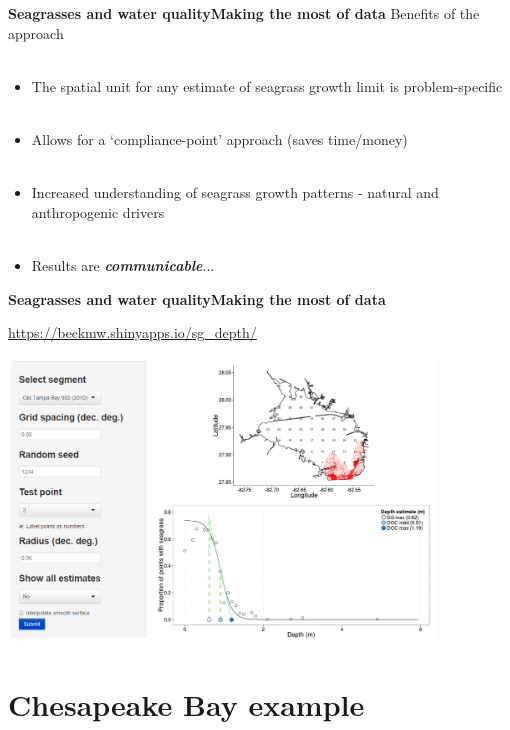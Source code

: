 \documentclass[serif]{beamer}\usepackage[]{graphicx}\usepackage[]{color}
\newcommand{\emtxt}[1]{\textbf{\textit{#1}}}
\begin{document}
\begin{frame}{\textbf{Seagrasses and water quality}}{\textbf{Making the most of data}}
Benefits of the approach \\~\\
\begin{itemize}
\item The spatial unit for any estimate of seagrass growth limit is problem-specific \\~\\
\item Allows for a `compliance-point' approach (saves time/money) \\~\\
\item Increased understanding of seagrass growth patterns - natural and anthropogenic drivers \\~\\
\item Results are \emtxt{communicable}...
\end{itemize}
\end{frame}

\begin{frame}{\textbf{Seagrasses and water quality}}{\textbf{Making the most of data}}
\centerline{\href{https://beckmw.shinyapps.io/sg_depth/}{https://beckmw.shinyapps.io/sg\_depth/}}
\centerline{\includegraphics[width = 0.85\textwidth]{fig/widget_ex.png}}
\end{frame}

\section{Chesapeake Bay example}
\end{document}
